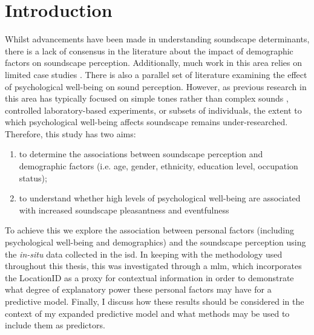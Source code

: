 \section{Introduction}

Whilst advancements have been made in understanding soundscape determinants, there is a lack of consensus in the literature about the impact of demographic factors on soundscape perception. Additionally, much work in this area relies on limited case studies \citep{Fang2021Soundscape,Ismail2014Sound,Yang2005Soundscape}. There is also a parallel set of literature examining the effect of psychological well-being on sound perception. However, as previous research in this area has typically focused on simple tones rather than complex sounds \citep{Laufer2016Behavioral,Riskind2014Influence}, controlled laboratory-based experiments, or subsets of individuals, the extent to which psychological well-being affects soundscape remains under-researched. Therefore, this study has two aims:

\begin{enumerate}
  \item to determine the associations between soundscape perception and demographic factors (i.e. age, gender, ethnicity, education level, occupation status);
  \item  to understand whether high levels of psychological well-being are associated with increased soundscape pleasantness and eventfulness
\end{enumerate}

To achieve this we explore the association between personal factors (including psychological well-being and demographics) and the soundscape perception using the \emph{in-situ} data collected in the \gls{isd}. In keeping with the methodology used throughout this thesis, this was investigated through a \gls{mlm}, which incorporates the LocationID as a proxy for contextual information in order to demonstrate what degree of explanatory power these personal factors may have for a predictive model. Finally, I discuss how these results should be considered in the context of my expanded predictive model and what methods may be used to include them as predictors.


